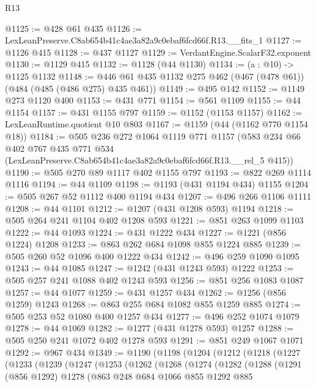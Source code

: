 \begin{lexlean}{R13}
\begin{coremodule}
@1125 := @428 @61 @435
@1126 := LexLeanPreserve.C8ab654b41c4ae3a82a9c0ebaf6fcd66f.R13.__fits_1
@1127 := @1126 @415
@1128 := @437 @1127
@1129 := VerdantEngine.ScalarF32.exponent
@1130 := @1129 @415
@1132 := @1128 (@44 @1130)
@1134 := (a : @10) -> @1125 @1132
@1148 := @446 @61 @435 @1132 @275 @462 (@467 (@478 @61)) (@484 (@485 (@486 @275) @435 @461))
@1149 := @495 @142
@1152 := @1149 @273 @1120 @400
@1153 := @431 @771
@1154 := @561 @1109
@1155 := @44 @1154
@1157 := @431 @1155 @797
@1159 := @1152 (@1153 @1157)
@1162 := LexLeanRuntime.quotient @10 @803
@1167 := @1159 (@44 (@1162 @770 @1154 @18))
@1184 := @505
    @236
    @272
    @1064
    @1119
    @771
    @1157
    (@583
      @234
      @66
      @402
      @767
      @435
      @771
      @534
      (LexLeanPreserve.C8ab654b41c4ae3a82a9c0ebaf6fcd66f.R13.__rel_5 @415))
@1190 := @505 @270 @89 @1117 @402 @1155 @797
@1193 := @822 @269 @1114 @1116
@1194 := @44 @1109
@1198 := @1193 (@431 @1194 @434) @1155
@1204 := @505 @267 @52 @1112 @400 @1194 @434
@1207 := @496 @266 @1106 @1111
@1208 := @44 @1101
@1212 := @1207 (@431 @1208 @593) @1194
@1218 := @505 @264 @241 @1104 @402 @1208 @593
@1221 := @851 @263 @1099 @1103
@1222 := @44 @1093
@1224 := @431 @1222 @434
@1227 := @1221 (@856 @1224) @1208
@1233 := @863 @262 @684 @1098 @855 @1224 @885
@1239 := @505 @260 @52 @1096 @400 @1222 @434
@1242 := @496 @259 @1090 @1095
@1243 := @44 @1085
@1247 := @1242 (@431 @1243 @593) @1222
@1253 := @505 @257 @241 @1088 @402 @1243 @593
@1256 := @851 @256 @1083 @1087
@1257 := @44 @1077
@1259 := @431 @1257 @434
@1262 := @1256 (@856 @1259) @1243
@1268 := @863 @255 @684 @1082 @855 @1259 @885
@1274 := @505 @253 @52 @1080 @400 @1257 @434
@1277 := @496 @252 @1074 @1079
@1278 := @44 @1069
@1282 := @1277 (@431 @1278 @593) @1257
@1288 := @505 @250 @241 @1072 @402 @1278 @593
@1291 := @851 @249 @1067 @1071
@1292 := @967 @434
@1349 := @1190
    (@1198
      (@1204
        (@1212
          (@1218
            (@1227
              (@1233
                (@1239
                  (@1247
                    (@1253
                      (@1262
                        (@1268
                          (@1274
                            (@1282
                              (@1288
                                (@1291
                                  (@856 @1292)
                                  @1278
                                  (@863
                                    @248
                                    @684
                                    @1066
                                    @855
                                    @1292
                                    @885

\end{coremodule}
\end{lexlean}

